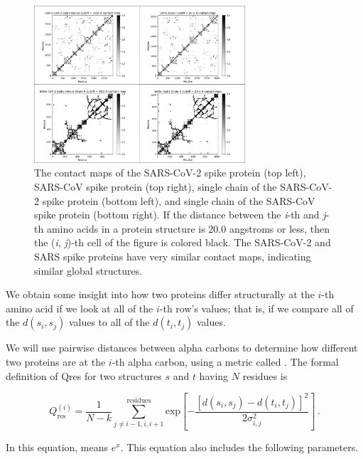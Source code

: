 {{\begin{figure}[h]
	\centering
	\mySfFamily
	\includegraphics[width = 0.7\textwidth]{../images/Contact.png}
	\caption{The contact maps of the SARS-CoV-2 spike protein (top left), SARS-CoV spike protein (top right), single chain of the SARS-CoV-2 spike protein (bottom left), and single chain of the SARS-CoV spike protein (bottom right). If the distance between the \textit{i}-th and \textit{j}-th amino acids in a protein structure is 20.0 angstroms or less, then the (\textit{i}, \textit{j})-th cell of the figure is colored black. The SARS-CoV-2 and SARS spike proteins have very similar contact maps, indicating similar global structures.}
	\label{fig:Contact}
\end{figure}

\begin{qbox}\end{qbox}

We obtain some insight into how two proteins differ structurally at the $i$-th amino acid if we look at all of the $i$-th row's values; that is, if we compare all of the $d(s_{i}, s_{j})$ values to all of the $d(t_{i}, t_{j})$ values.

We will use pairwise distances between alpha carbons to determine how different two proteins are at the $i$-th alpha carbon, using a metric called .  The formal definition of Qres for two structures $s$ and $t$ having $N$ residues is

$$Q_{\text{res}}^{(i)} = \dfrac{1}{N-k} \sum^{\text{residues}}_{j\neq i-1,i,i+1} \textrm{exp}[-\dfrac{[d(s_i,s_j)-d(t_i,t_j)]^2}{2\sigma^2_{i,j}}]\, .$$

In this equation,  means $e^{x}$. This equation also includes the following parameters.

}}
